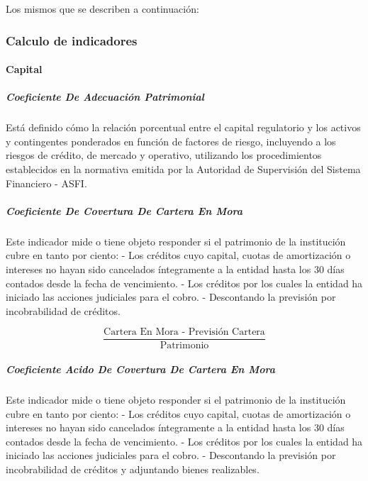 \documentclass[
  12pt,
]{article}
\begin{document}
Los mismos que se describen a continuación:

\hypertarget{calculo-de-indicadores}{%
\subsubsection{Calculo de indicadores}\label{calculo-de-indicadores}}

\hypertarget{capital}{%
\paragraph{Capital}\label{capital}}

\hypertarget{coeficiente-de-adecuaciuxf3n-patrimonial}{%
\subparagraph{Coeficiente De Adecuación
Patrimonial}\label{coeficiente-de-adecuaciuxf3n-patrimonial}}

Está definido cómo la relación porcentual entre el capital regulatorio y
los activos y contingentes ponderados en función de factores de riesgo,
incluyendo a los riesgos de crédito, de mercado y operativo, utilizando
los procedimientos establecidos en la normativa emitida por la Autoridad
de Supervisión del Sistema Financiero - ASFI.

\hypertarget{coeficiente-de-covertura-de-cartera-en-mora}{%
\subparagraph{Coeficiente De Covertura De Cartera En
Mora}\label{coeficiente-de-covertura-de-cartera-en-mora}}

Este indicador mide o tiene objeto responder si el patrimonio de la
institución cubre en tanto por ciento: - Los créditos cuyo capital,
cuotas de amortización o intereses no hayan sido cancelados íntegramente
a la entidad hasta los 30 días contados desde la fecha de vencimiento. -
Los créditos por los cuales la entidad ha iniciado las acciones
judiciales para el cobro. - Descontando la previsión por incobrabilidad
de créditos.

\[ \frac{ \text{Cartera En Mora - Previsión Cartera} }{\text{Patrimonio}}\]

\hypertarget{coeficiente-acido-de-covertura-de-cartera-en-mora}{%
\subparagraph{Coeficiente Acido De Covertura De Cartera En
Mora}\label{coeficiente-acido-de-covertura-de-cartera-en-mora}}

Este indicador mide o tiene objeto responder si el patrimonio de la
institución cubre en tanto por ciento: - Los créditos cuyo capital,
cuotas de amortización o intereses no hayan sido cancelados íntegramente
a la entidad hasta los 30 días contados desde la fecha de vencimiento. -
Los créditos por los cuales la entidad ha iniciado las acciones
judiciales para el cobro. - Descontando la previsión por incobrabilidad
de créditos y adjuntando bienes realizables.
\end{document}
